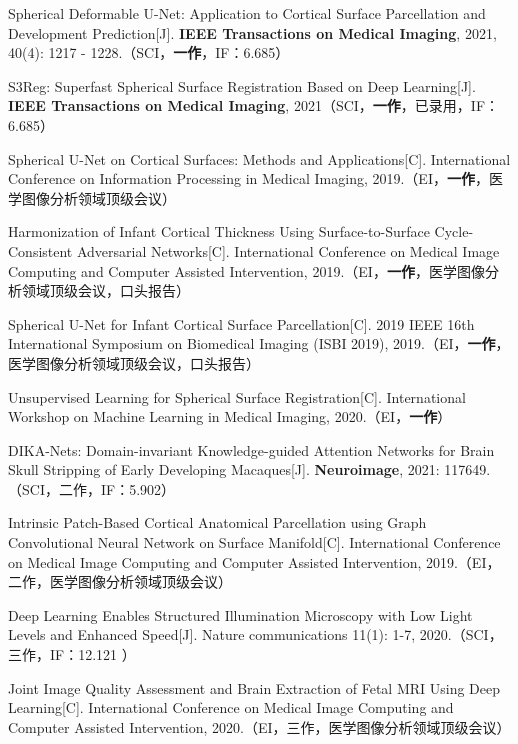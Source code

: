 \cleardoublepage
{}


\noindent [1] Spherical Deformable U-Net: Application to Cortical Surface Parcellation and Development Prediction[J]. \textbf{IEEE Transactions on Medical Imaging}, 2021, 40(4): 1217 - 1228.（SCI，\textbf{一作}，IF：6.685）

\noindent [2] S3Reg: Superfast Spherical Surface Registration Based on Deep Learning[J]. \textbf{IEEE Transactions on Medical Imaging}, 2021（SCI，\textbf{一作}，已录用，IF：6.685）

\noindent [3] Spherical U-Net on Cortical Surfaces: Methods and Applications[C]. International Conference on Information Processing in Medical Imaging, 2019.（EI，\textbf{一作}，医学图像分析领域顶级会议）

\noindent [4] Harmonization of Infant Cortical Thickness Using Surface-to-Surface Cycle-Consistent Adversarial Networks[C]. International Conference on Medical Image Computing and Computer Assisted Intervention, 2019.（EI，\textbf{一作}，医学图像分析领域顶级会议，口头报告）

\noindent [5] Spherical U-Net for Infant Cortical Surface Parcellation[C]. 2019 IEEE 16th International Symposium on Biomedical Imaging (ISBI 2019), 2019.（EI，\textbf{一作}，医学图像分析领域顶级会议，口头报告）

\noindent [6] Unsupervised Learning for Spherical Surface Registration[C]. International Workshop on Machine Learning in Medical Imaging, 2020.（EI，\textbf{一作}）

\noindent [7] DIKA-Nets: Domain-invariant Knowledge-guided Attention Networks for Brain Skull Stripping of Early Developing Macaques[J]. \textbf{Neuroimage}, 2021: 117649.（SCI，二作，IF：5.902） 

\noindent [8] Intrinsic Patch-Based Cortical Anatomical Parcellation using Graph Convolutional Neural Network on Surface Manifold[C]. International Conference on Medical Image Computing and Computer Assisted Intervention, 2019.（EI，二作，医学图像分析领域顶级会议）

\noindent [9] Deep Learning Enables Structured Illumination Microscopy with Low Light Levels and Enhanced Speed[J]. Nature communications 11(1): 1-7, 2020.（SCI，三作，IF：12.121 ）

\noindent [10] Joint Image Quality Assessment and Brain Extraction of Fetal MRI Using Deep Learning[C]. International Conference on Medical Image Computing and Computer Assisted Intervention, 2020.（EI，三作，医学图像分析领域顶级会议）

